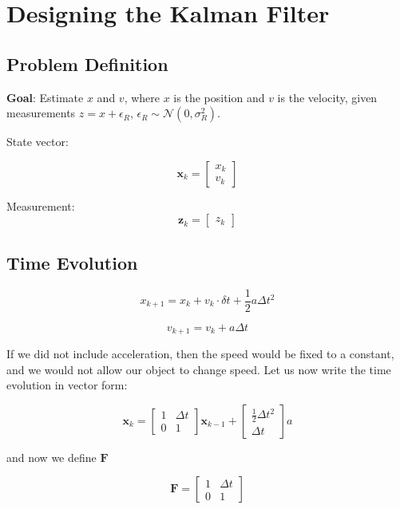 \documentclass{article}
\begin{document}
\section{Designing the Kalman Filter}

\subsection{Problem Definition}
\textbf{Goal}: Estimate $x$ and $v$, where $x$ is the position and $v$ is the velocity, given measurements $z = x + \epsilon_R$, $\epsilon_R \sim \mathcal{N}(0, \sigma_R^2)$.

State vector:

\[
\mathbf{x}_k =
\begin{bmatrix}
x_k \\ v_k
\end{bmatrix}
\]

Measurement:
\[
\mathbf{z}_k =
\begin{bmatrix}
z_k
\end{bmatrix}
\]

\subsection{Time Evolution}

\begin{equation}
x_{k+1} = x_k + v_k \cdot \delta t + \frac{1}{2}a \Delta t^2
\end{equation}

\begin{equation}
v_{k+1} = v_k + a \Delta t
\end{equation}

If we did not include acceleration, then the speed would be fixed to a constant, and we would not allow our object to change speed. Let us now write the time evolution in vector form:

\[
\mathbf{x}_k =
\begin{bmatrix}
1 & \Delta t \\
0 & 1
\end{bmatrix}
\mathbf{x}_{k-1}
+
\begin{bmatrix}
\frac{1}{2} \Delta t^2 \\
\Delta t
\end{bmatrix}
a
\]

and now we define $\mathbf{F}$

\[
\mathbf{F} =
\begin{bmatrix}
1 & \Delta t \\
0 & 1
\end{bmatrix}
\]
\end{document}
